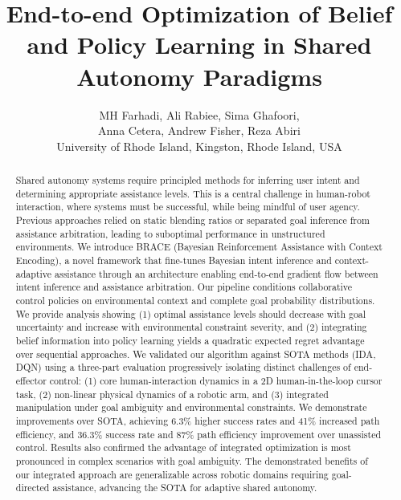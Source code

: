 \documentclass[11pt]{article}
\begin{document}
\title{End-to-end Optimization of Belief and Policy Learning in Shared Autonomy Paradigms}

\author{
MH Farhadi, Ali Rabiee, Sima Ghafoori,\\
Anna Cetera, Andrew Fisher,
Reza Abiri \\
University of Rhode Island, Kingston, Rhode Island, USA
}
\date{}

\maketitle

\begin{abstract}
  Shared autonomy systems require principled methods for inferring user intent and determining appropriate assistance levels. This is a central challenge in human-robot interaction, where systems must be successful, while being mindful of user agency. Previous approaches relied on static blending ratios or separated goal inference from assistance arbitration, leading to suboptimal performance in unstructured environments. We introduce BRACE (Bayesian Reinforcement Assistance with Context Encoding), a novel framework that fine-tunes Bayesian intent inference and context-adaptive assistance through an architecture enabling end-to-end gradient flow between intent inference and assistance arbitration. Our pipeline conditions collaborative control policies on environmental context and complete goal probability distributions. We provide analysis showing (1) optimal assistance levels should decrease with goal uncertainty and increase with environmental constraint severity, and (2) integrating belief information into policy learning yields a quadratic expected regret advantage over sequential approaches. We validated our algorithm against SOTA methods (IDA, DQN) using a three-part evaluation progressively isolating distinct challenges of end-effector control: (1) core human-interaction dynamics in a 2D human-in-the-loop cursor task, (2) non-linear physical dynamics of a robotic arm, and (3) integrated manipulation under goal ambiguity and environmental constraints. We demonstrate improvements over SOTA, achieving 6.3\% higher success rates and 41\% increased path efficiency, and 36.3\% success rate and 87\% path efficiency improvement over unassisted control. Results also confirmed the advantage of integrated optimization is most pronounced in complex scenarios with goal ambiguity. The demonstrated benefits of our integrated approach are generalizable across robotic domains requiring goal-directed assistance, advancing the SOTA for adaptive shared autonomy.
\end{abstract}
\end{document}

